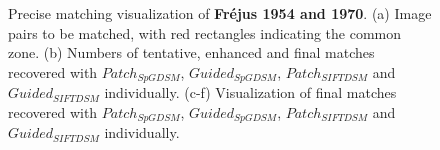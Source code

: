 \begin{figure}[htbp]
\begin{center}
{\begin{minipage}[t]{0.48\linewidth}
			\end{minipage}%
		}
		\caption{Precise matching visualization of \textbf{Fr{\'e}jus 1954 and 1970}. (a) Image pairs to be matched, with red rectangles indicating the common zone. (b) Numbers of tentative, enhanced and final matches recovered with $Patch_{SpGDSM}$, $Guided_{SpGDSM}$, $Patch_{SIFTDSM}$ and $Guided_{SIFTDSM}$ individually. (c-f) Visualization of final matches recovered with $Patch_{SpGDSM}$, $Guided_{SpGDSM}$, $Patch_{SIFTDSM}$ and $Guided_{SIFTDSM}$ individually.}
		\label{MatchVizFrejus1954-1970}
	\end{center}
\end{figure} 



